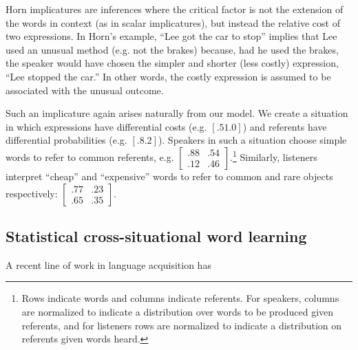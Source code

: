 \documentclass{article} %
\begin{document}
Horn implicatures are inferences where the critical factor is not the extension of the words in context (as in scalar implicatures), but instead the relative cost of two expressions. In Horn's example, ``Lee got the car to stop'' implies that Lee used an unusual method (e.g. not the brakes) because, had he used the brakes, the speaker would have chosen the simpler and shorter (less costly) expression, ``Lee stopped the car.'' In other words, the costly expression is assumed to be associated with the unusual outcome.

Such an implicature again arises naturally from our model. We create a situation in which expressions have differential costs (e.g. $[.5 1.0]$) and referents have differential probabilities (e.g. $[.8 .2]$). Speakers in such a situation choose simple words to refer to common referents, e.g. 
$\left[
    \begin{array}{cc}
      .88 & .54 \\
      .12 & .46
    \end{array} 
  \right]$.\footnote{Rows indicate words and columns indicate referents. For speakers, columns are normalized to indicate a distribution over words to be produced given referents, and for listeners rows are normalized to indicate a distribution on referents given words heard.} Similarly, listeners interpret ``cheap'' and ``expensive'' words to refer to common and rare objects respectively:
$\left[
    \begin{array}{cc}
      .77 & .23 \\
      .65 & .35
    \end{array} 
  \right]$.


%
%

\subsection{Statistical cross-situational word learning}

A recent line of work in language acquisition has 
\end{document}

